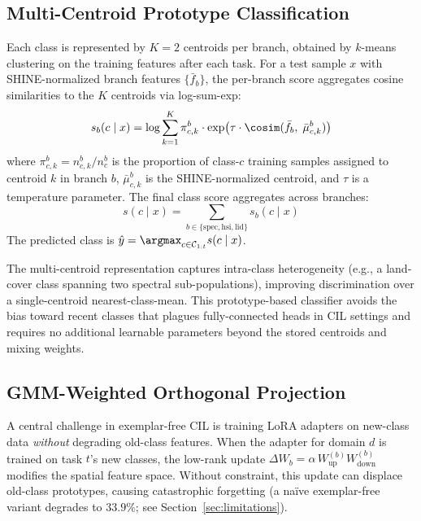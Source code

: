 \subsection{Multi-Centroid Prototype Classification}
\label{sec:classifier}

Each class is represented by $K{=}2$ centroids per branch, obtained by $k$-means clustering on the training features after each task.
For a test sample $x$ with SHINE-normalized branch features $\{\bar{f}_b\}$, the per-branch score aggregates cosine similarities to the $K$ centroids via log-sum-exp:
\begin{equation}
    s_b(c \mid x) = \log \sum_{k=1}^{K} \pi_{c,k}^b \cdot \exp\!\left(\tau \cdot \cosim(\bar{f}_b,\; \bar{\mu}_{c,k}^b)\right)
\label{eq:multi_centroid_score}
\end{equation}
where $\pi_{c,k}^b = n_{c,k}^b / n_c^b$ is the proportion of class-$c$ training samples assigned to centroid $k$ in branch $b$, $\bar{\mu}_{c,k}^b$ is the SHINE-normalized centroid, and $\tau$ is a temperature parameter.
The final class score aggregates across branches:
\begin{equation}
    s(c \mid x) = \sum_{b \in \{\mathrm{spec}, \mathrm{hsi}, \mathrm{lid}\}} s_b(c \mid x)
\label{eq:ncm}
\end{equation}
The predicted class is $\hat{y} = \argmax_{c \in \mathcal{C}_{1:t}} s(c \mid x)$.

The multi-centroid representation captures intra-class heterogeneity (e.g., a land-cover class spanning two spectral sub-populations), improving discrimination over a single-centroid nearest-class-mean.
This prototype-based classifier avoids the bias toward recent classes that plagues fully-connected heads in CIL settings and requires no additional learnable parameters beyond the stored centroids and mixing weights.

\subsection{GMM-Weighted Orthogonal Projection}
\label{sec:gmm_ortho}

A central challenge in exemplar-free CIL is training LoRA adapters on new-class data \emph{without} degrading old-class features.
When the adapter for domain $d$ is trained on task $t$'s new classes, the low-rank update $\Delta W_b = \alpha\, W_{\mathrm{up}}^{(b)} W_{\mathrm{down}}^{(b)}$ modifies the spatial feature space.
Without constraint, this update can displace old-class prototypes, causing catastrophic forgetting (a na\"ive exemplar-free variant degrades to $33.9\%$; see Section~\ref{sec:limitations}).

